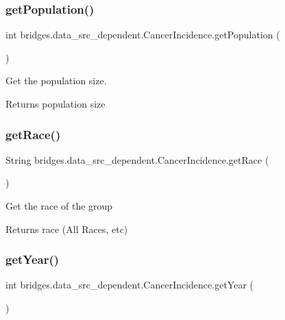 \subsubsection{\texorpdfstring{getPopulation()}{getPopulation()}}
{\footnotesize\ttfamily int bridges.\+data\+\_\+src\+\_\+dependent.\+Cancer\+Incidence.\+get\+Population (\begin{DoxyParamCaption}{ }\end{DoxyParamCaption})}



Get the population size. 

\begin{DoxyReturn}{Returns}
population size 
\end{DoxyReturn}
\mbox{\label{classbridges_1_1data__src__dependent_1_1_cancer_incidence_a18de1c14d36cd7656555c8465ea8a009}} 
\subsubsection{\texorpdfstring{getRace()}{getRace()}}
{\footnotesize\ttfamily String bridges.\+data\+\_\+src\+\_\+dependent.\+Cancer\+Incidence.\+get\+Race (\begin{DoxyParamCaption}{ }\end{DoxyParamCaption})}

Get the race of the group

\begin{DoxyReturn}{Returns}
race (All Races, etc) 
\end{DoxyReturn}
\mbox{\label{classbridges_1_1data__src__dependent_1_1_cancer_incidence_aaff714019154afa796d54ed57ffc9492}} 
\subsubsection{\texorpdfstring{getYear()}{getYear()}}
{\footnotesize\ttfamily int bridges.\+data\+\_\+src\+\_\+dependent.\+Cancer\+Incidence.\+get\+Year (\begin{DoxyParamCaption}{ }\end{DoxyParamCaption})}




